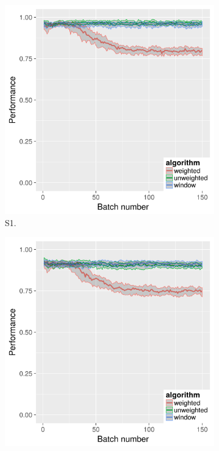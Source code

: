 \begin{figure}[h]
\begin{subfigure}{.45\textwidth}
  \centering
  \includegraphics[width=.9\linewidth]{s_set/s_set_1_with_weighted_ci_one_size_vmeasure.png}
  \caption{S1.}
\end{subfigure}%
\begin{subfigure}{.45\textwidth}
  \centering
  \includegraphics[width=.9\linewidth]{s_set/s_set_2_with_weighted_ci_one_size_vmeasure.png}

\end{subfigure}
\end{figure}
